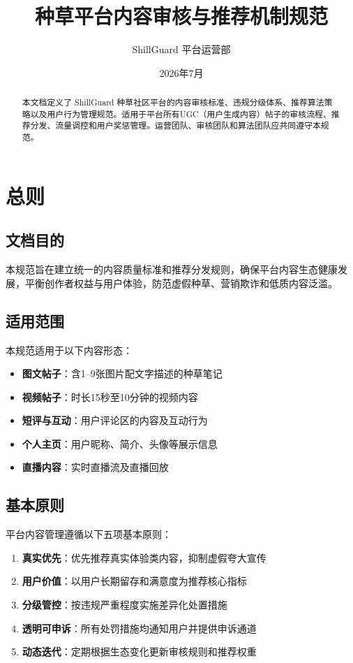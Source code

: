 \documentclass[a4paper,12pt]{article}
\title{\textbf{种草平台内容审核与推荐机制规范}}
\author{ShillGuard 平台运营部}
\date{2026年7月}
\begin{document}
\maketitle
\thispagestyle{empty}

\begin{abstract}
本文档定义了 ShillGuard 种草社区平台的内容审核标准、违规分级体系、推荐算法策略以及用户行为管理规范。适用于平台所有UGC（用户生成内容）帖子的审核流程、推荐分发、流量调控和用户奖惩管理。运营团队、审核团队和算法团队应共同遵守本规范。
\end{abstract}

\tableofcontents
\newpage

\section{总则}

\subsection{文档目的}
本规范旨在建立统一的内容质量标准和推荐分发规则，确保平台内容生态健康发展，平衡创作者权益与用户体验，防范虚假种草、营销欺诈和低质内容泛滥。

\subsection{适用范围}
本规范适用于以下内容形态：
\begin{itemize}[noitemsep]
  \item \textbf{图文帖子}：含1--9张图片配文字描述的种草笔记
  \item \textbf{视频帖子}：时长15秒至10分钟的视频内容
  \item \textbf{短评与互动}：用户评论区的内容及互动行为
  \item \textbf{个人主页}：用户昵称、简介、头像等展示信息
  \item \textbf{直播内容}：实时直播流及直播回放
\end{itemize}

\subsection{基本原则}
平台内容管理遵循以下五项基本原则：
\begin{enumerate}[noitemsep]
  \item \textbf{真实优先}：优先推荐真实体验类内容，抑制虚假夸大宣传
  \item \textbf{用户价值}：以用户长期留存和满意度为推荐核心指标
  \item \textbf{分级管控}：按违规严重程度实施差异化处置措施
  \item \textbf{透明可申诉}：所有处罚措施均通知用户并提供申诉通道
  \item \textbf{动态迭代}：定期根据生态变化更新审核规则和推荐权重
\end{enumerate}
\end{document}
